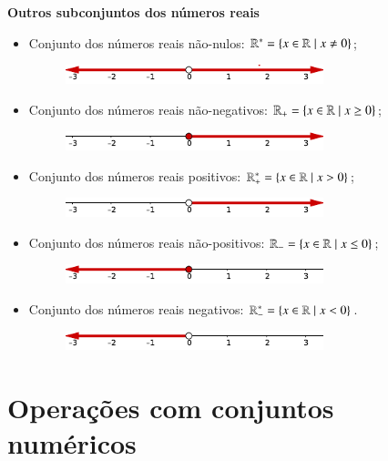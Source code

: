 \textbf{Outros subconjuntos dos números reais}
\begin{itemize}
 \item Conjunto dos números reais não-nulos: $\mathbb{R}^{*}=\{x \in \mathbb{R} \mid x \neq 0\}$;
 \begin{figure}[H]
 \centering
 \includegraphics[width=7.5cm]{Capitulos/Figuras/n-nulos.pdf}
 \end{figure}
 \item Conjunto dos números reais não-negativos: $\mathbb{R}_{+}=\{x \in \mathbb{R} \mid x \geq 0\}$;
 \begin{figure}[H]
 \centering
 \includegraphics[width=7.5cm]{Capitulos/Figuras/n-negativos.pdf}
 \end{figure}
 \item Conjunto dos números reais positivos: $\mathbb{R}^{*}_{+}=\{x \in \mathbb{R} \mid x > 0\}$;
 \begin{figure}[H]
 \centering
 \includegraphics[width=7.5cm]{Capitulos/Figuras/positivos.pdf}
 \end{figure}
 \item Conjunto dos números reais não-positivos: $\mathbb{R}_{-}=\{x \in \mathbb{R} \mid x \leq 0\}$;
 \begin{figure}[H]
 \centering
 \includegraphics[width=7.5cm]{Capitulos/Figuras/n-positivos.pdf}
 \end{figure}
 \item Conjunto dos números reais negativos: $\mathbb{R}^{*}_{-}=\{x \in \mathbb{R} \mid x < 0\}$.
 \begin{figure}[H]
 \centering
 \includegraphics[width=7.5cm]{Capitulos/Figuras/negativos.pdf}
 \end{figure}
\end{itemize}

\section{Operações com conjuntos numéricos}

